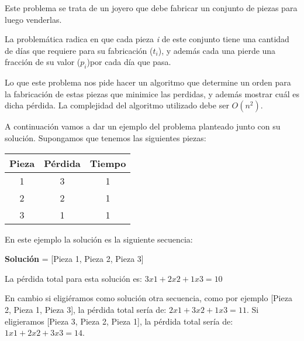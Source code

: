 Este problema se trata de un joyero que debe fabricar un conjunto de piezas para luego venderlas. 

La problemática radica en que cada pieza \emph{i} de este conjunto tiene una cantidad de días que requiere para su fabricación  (\emph{$t_i$}), y además cada una pierde una fracción de su valor (\emph{$p_i$})por cada día que pasa.

Lo que este problema nos pide hacer un algoritmo que determine un orden para la fabricación de estas piezas que minimice las perdidas, y además mostrar cuál es dicha pérdida. La complejidad del algoritmo utilizado debe ser $O(n^2)$.

A continuación vamos a dar un ejemplo del problema planteado junto con su solución. Supongamos que tenemos las siguientes piezas:

\begin{tabular}{|c|c|c|}
 \hline
 \textbf{Pieza} & \textbf{Pérdida} & \textbf{Tiempo} \\
 \hline
 1 & 3 & 1 \\
 
 2 & 2 & 1 \\
 
 3 & 1 & 1 \\
 \hline
\end{tabular}

En este ejemplo la solución es la siguiente secuencia:

\textbf{Solución} = [Pieza 1, Pieza 2, Pieza 3]

La pérdida total para esta solución es: $3x1 + 2x2 + 1x3 = 10$

En cambio si eligiéramos como solución otra secuencia, como por ejemplo [Pieza 2, Pieza 1, Pieza 3], la pérdida total sería de: $2x1 + 3x2 + 1x3 = 11$. Si eligieramos [Pieza 3, Pieza 2, Pieza 1], la pérdida total sería de: $1x1 + 2x2 + 3x3 = 14$.